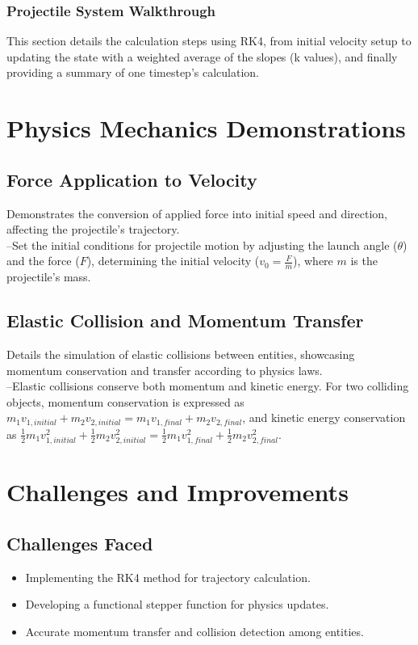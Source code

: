 \documentclass[12pt]{article}
\begin{document}
\subsubsection{Projectile System Walkthrough}
This section details the calculation steps using RK4, from initial velocity setup to updating the state with a weighted average of the slopes (k values), and finally providing a summary of one timestep's calculation.

\section{Physics Mechanics Demonstrations}
\subsection{Force Application to Velocity}
Demonstrates the conversion of applied force into initial speed and direction, affecting the projectile's trajectory.\\
--Set the initial conditions for projectile motion by adjusting the launch angle (\(\theta\)) and the force (\(F\)), determining the initial velocity (\(v_0 = \frac{F}{m}\)), where \(m\) is the projectile's mass.

\subsection{Elastic Collision and Momentum Transfer}
Details the simulation of elastic collisions between entities, showcasing momentum conservation and transfer according to physics laws.\\
--Elastic collisions conserve both momentum and kinetic energy. For two colliding objects, momentum conservation is expressed as \(m_1v_{1,initial} + m_2v_{2,initial} = m_1v_{1,final} + m_2v_{2,final}\), and kinetic energy conservation as \(\frac{1}{2}m_1v_{1,initial}^2 + \frac{1}{2}m_2v_{2,initial}^2 = \frac{1}{2}m_1v_{1,final}^2 + \frac{1}{2}m_2v_{2,final}^2\).
    

\section{Challenges and Improvements}
\subsection{Challenges Faced}
\begin{itemize}
    \item Implementing the RK4 method for trajectory calculation.
    \item Developing a functional stepper function for physics updates.
    \item Accurate momentum transfer and collision detection among entities.
\end{itemize}
\end{document}
